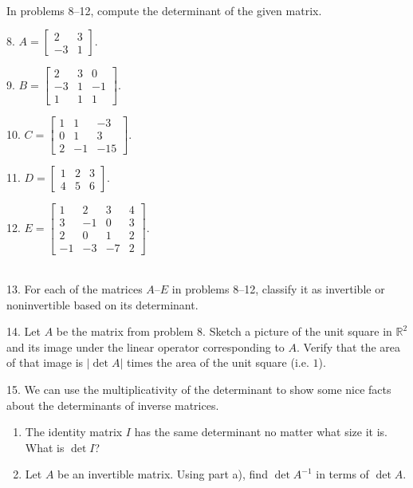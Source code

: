 \documentclass{article}
\begin{document}
~\\

In problems 8--12, compute the determinant of the given matrix.

8. $\displaystyle A = \left[\begin{array}{cc} 2& 3 \\ -3& 1 \end{array}\right]$.

9. $\displaystyle B = \left[\begin{array}{ccc} 2& 3& 0 \\ -3& 1& -1 \\ 1& 1& 1 \end{array}\right]$.

10. $\displaystyle C = \left[\begin{array}{ccc} 1& 1& -3 \\ 0& 1& 3 \\ 2& -1& -15 \end{array}\right]$.

11. $\displaystyle D = \left[\begin{array}{ccc} 1& 2& 3 \\ 4& 5& 6 \end{array}\right]$.

12. $\displaystyle E = \left[\begin{array}{cccc} 1& 2& 3& 4 \\ 3& -1& 0& 3 \\ 2& 0& 1& 2\\ -1& -3& -7& 2 \end{array}\right]$.

~\\

13. For each of the matrices $A$--$E$ in problems 8--12, classify it as invertible or noninvertible based on its determinant.

14. Let $A$ be the matrix from problem 8. Sketch a picture of the unit square in $\mathbb{R}^2$ and its image under the linear operator corresponding to $A$. Verify that the area of that image is $|\det A|$ times the area of the unit square (i.e. $1$).

15. We can use the multiplicativity of the determinant to show some nice facts about the determinants of inverse matrices.

\begin{enumerate}

	\item The identity matrix $I$ has the same determinant no matter what size it is. What is $\det I$?

	\item Let $A$ be an invertible matrix. Using part a), find $\det A^{-1}$ in terms of $\det A$.

\end{enumerate}
\end{document}
